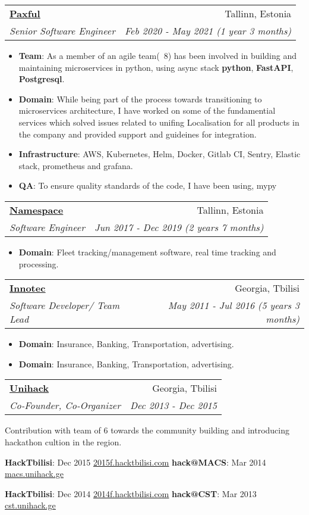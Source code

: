 \documentclass[letterpaper,11pt]{article}
\makeatletter
\newcommand{\resumeItem}[2]{
  \item\small{
    \textbf{#1}{: #2 \vspace{-2pt}}
  }
}
\newcommand{\resumeSubheading}[4]{
  \vspace{-1pt}\item
    \begin{tabular*}{0.97\textwidth}{l@{\extracolsep{\fill}}r}
      \textbf{#1} & #2 \\
      \textit{\small#3} & \textit{\small #4} \\
    \end{tabular*}\vspace{-5pt}
}
\newcommand{\resumeItemListStart}{\begin{itemize}}
\newcommand{\resumeItemListEnd}{\end{itemize}\vspace{-5pt}}
\makeatother
\begin{document}
\resumeSubheading
      {\href{https://paxful.com}{\underline{Paxful}}}{Tallinn, Estonia}
      {Senior Software Engineer}{Feb 2020 - May 2021 (1 year 3 months)}
      \resumeItemListStart
        \resumeItem{Team}
          {As a member of an agile team(~8) has been involved in building and maintaining microservices in python, using async stack \textbf{python}, \textbf{FastAPI}, \textbf{Postgresql}.}
        \resumeItem{Domain}{While being part of the process towards transitioning to microservices architecture, I have worked on some of the fundamential services which solved issues related to unifing Localisation for all products in the company and provided support and guideines for integration.}
        \resumeItem{Infrastructure}
          {AWS, Kubernetes, Helm, Docker, Gitlab CI, Sentry, Elastic stack, prometheus and grafana.}
		\resumeItem{QA}
          {To ensure quality standards of the code, I have been using, mypy }
      \resumeItemListEnd
	
    \resumeSubheading
      {\href{https://namespace.ee}{\underline{Namespace}}}{Tallinn, Estonia}
      {Software Engineer}{Jun 2017 - Dec 2019 (2 years 7 months)}
      \resumeItemListStart
        \resumeItem{Domain}
          {Fleet tracking/management software, real time tracking and processing.}
      \resumeItemListEnd

    \resumeSubheading
      {\href{http://innotec.ge/}{\underline{Innotec}}}{Georgia, Tbilisi}
      {Software Developer/ Team Lead}{May 2011 - Jul 2016 (5 years 3 months)}
      \resumeItemListStart
        \resumeItem{Domain}
          {Insurance, Banking, Transportation, advertising.}
        \resumeItem{Domain}
          {Insurance, Banking, Transportation, advertising.}
      \resumeItemListEnd
      
     \resumeSubheading
      {\href{https://www.facebook.com/unihackge/}{\underline{Unihack}}}{Georgia, Tbilisi}
      {Co-Founder, Co-Organizer}{Dec 2013 - Dec 2015}

		Contribution with team of 6 towards the community building and introducing hackathon cultion in the region.

     \textbf{HackTbilisi}{: Dec 2015 \href{https://www.facebook.com/events/684989148311419/}{\underline{2015f.hacktbilisi.com}}}
     \hfill
     \textbf{hack@MACS}{: Mar 2014 \href{https://www.facebook.com/events/449121528548787/}{\underline{macs.unihack.ge}}}
     
     \textbf{HackTbilisi}{: Dec 2014 \href{https://www.facebook.com/events/580741565385417/}{\underline{2014f.hacktbilisi.com}}}
     \hfill
     \textbf{hack@CST}{: Mar 2013  \href{https://www.facebook.com/events/534752266617343/}{\underline{cst.unihack.ge}}}	
	
\end{document}
